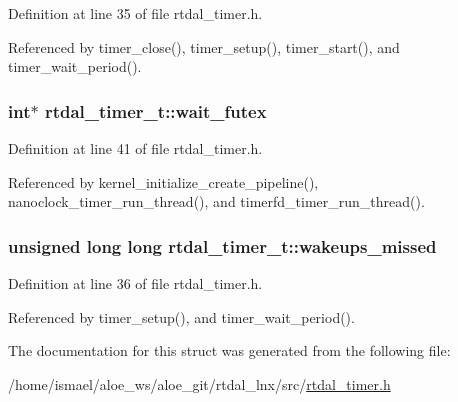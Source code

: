 Definition at line 35 of file rtdal\-\_\-timer.\-h.



Referenced by timer\-\_\-close(), timer\-\_\-setup(), timer\-\_\-start(), and timer\-\_\-wait\-\_\-period().

\hypertarget{structrtdal__timer__t_a5f908aa671f7e3adffbc9096c1dc415a}{
\subsubsection[{wait\-\_\-futex}]{\setlength{\rightskip}{0pt plus 5cm}int$\ast$ rtdal\-\_\-timer\-\_\-t\-::wait\-\_\-futex}}\label{structrtdal__timer__t_a5f908aa671f7e3adffbc9096c1dc415a}


Definition at line 41 of file rtdal\-\_\-timer.\-h.



Referenced by kernel\-\_\-initialize\-\_\-create\-\_\-pipeline(), nanoclock\-\_\-timer\-\_\-run\-\_\-thread(), and timerfd\-\_\-timer\-\_\-run\-\_\-thread().

\hypertarget{structrtdal__timer__t_ad605ac13eeb5dd9ba9715685e965e019}{
\subsubsection[{wakeups\-\_\-missed}]{\setlength{\rightskip}{0pt plus 5cm}unsigned long long rtdal\-\_\-timer\-\_\-t\-::wakeups\-\_\-missed}}\label{structrtdal__timer__t_ad605ac13eeb5dd9ba9715685e965e019}


Definition at line 36 of file rtdal\-\_\-timer.\-h.



Referenced by timer\-\_\-setup(), and timer\-\_\-wait\-\_\-period().



The documentation for this struct was generated from the following file\-:\begin{DoxyCompactItemize}
\item 
/home/ismael/aloe\-\_\-ws/aloe\-\_\-git/rtdal\-\_\-lnx/src/\hyperlink{rtdal__timer_8h}{rtdal\-\_\-timer.\-h}\end{DoxyCompactItemize}
